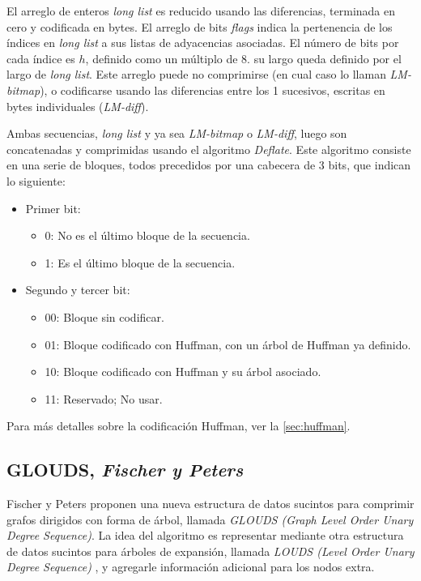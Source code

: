 El arreglo de enteros \textit{long list} es reducido usando las diferencias, terminada en cero y codificada en bytes. El arreglo de bits \textit{flags} indica la pertenencia de los índices en \textit{long list} a sus listas de adyacencias asociadas. El número de bits por cada índice es $h$, definido como un múltiplo de 8. su largo queda definido por el largo de \textit{long list}. Este arreglo puede no comprimirse (en cual caso lo llaman \textit{LM-bitmap}), o codificarse usando las diferencias entre los 1 sucesivos, escritas en bytes individuales (\textit{LM-diff}).

Ambas secuencias, \textit{long list} y ya sea \textit{LM-bitmap} o \textit{LM-diff}, luego son concatenadas y comprimidas usando el algoritmo \textit{Deflate}. Este algoritmo consiste en una serie de bloques, todos precedidos por una cabecera de 3 bits, que indican lo siguiente:

\begin{itemize}
	\item Primer bit:
	\begin{itemize}
		\item 0: No es el último bloque de la secuencia.
		\item 1: Es el último bloque de la secuencia.
	\end{itemize}
	\item Segundo y tercer bit:
	\begin{itemize}
		\item 00: Bloque sin codificar.
		\item 01: Bloque codificado con Huffman, con un árbol de Huffman ya definido.
		\item 10: Bloque codificado con Huffman y su árbol asociado.
		\item 11: Reservado; No usar.
	\end{itemize}
\end{itemize}

Para más detalles sobre la codificación Huffman, ver la \autoref{sec:huffman}.


\subsection{GLOUDS, \textit{Fischer y Peters}}
Fischer y Peters \cite{fischer2016glouds} proponen una nueva estructura de datos sucintos para comprimir grafos dirigidos con forma de árbol, llamada \textit{GLOUDS (Graph Level Order Unary Degree Sequence)}. La idea del algoritmo es representar mediante otra estructura de datos sucintos para árboles de expansión, llamada \textit{LOUDS (Level Order Unary Degree Sequence)} \cite{jacobson1989space}, y agregarle información adicional para los nodos extra.

